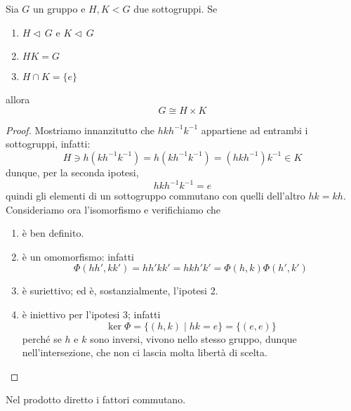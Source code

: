 \begin{multicols}{2}



\begin{theorem}[di Struttura]{\label{struttura}}
	Sia $ G $ un gruppo e $ H, K < G $ due sottogruppi. Se
	\begin{enumerate}
		\item $ H \lhd\, G $   e   $ K \lhd\, G $
		\item $ HK = G $
		\item $ H \cap K = \{e\} $
	\end{enumerate}
allora $$  G \cong H \times K  $$
\end{theorem}
\begin{proof}
	Mostriamo innanzitutto che $ hkh^{-1}k^{-1} $ appartiene ad entrambi i sottogruppi, infatti:
	\[ H  \ni h(kh^{-1}k^{-1}) = h(kh^{-1}k^{-1}) = (hkh^{-1})k^{-1} \in K \]
	dunque, per la seconda ipotesi, $$ hkh^{-1}k^{-1} = e $$ quindi gli elementi di un sottogruppo commutano con quelli dell'altro $ hk = kh $.\\
	
	Consideriamo ora l'isomorfismo 
	e verifichiamo che
	\begin{enumerate}
		\item è ben definito.
		\item è un omomorfismo: infatti \[ \Phi(hh', kk') = hh'kk' = hkh'k' = \Phi(h, k)\Phi(h',k') \]
		\item è suriettivo; ed è, sostanzialmente, l'ipotesi 2.
		\item è iniettivo per l'ipotesi 3; infatti \[ \ker\Phi = \{ (h, k) \mid hk = e \} = \{ (e, e) \} \]
		perché se $ h $ e $ k $ sono inversi, vivono nello stesso gruppo, dunque nell'intersezione, che non ci lascia molta libertà di scelta.
	\end{enumerate}
\end{proof}

\begin{remark}
	Nel prodotto diretto i fattori commutano.
\end{remark}


\end{multicols}

